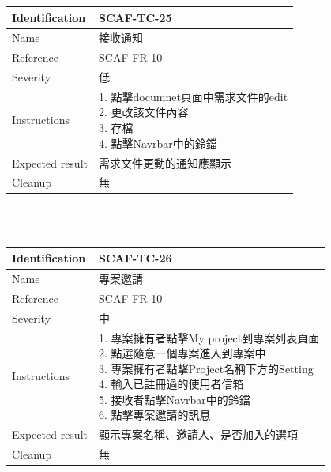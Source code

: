 \documentclass{report}
\begin{document}
\begin{tabularx}{\textwidth}{
  |p{}%
  |p{}|%
  }
  \hline
  \centering Identification &  SCAF-TC-25 \\
  \hline
  \centering Name & 接收通知 \\
  \hline
  \centering Reference & SCAF-FR-10 \\
  \hline
  \centering Severity & 低 \\
  \hline
  \centering Instructions & 
  \makecell[l]{
    1. 點擊documnet頁面中需求文件的edit \\
    2. 更改該文件內容  \\
    3. 存檔  \\
    4. 點擊Navrbar中的鈴鐺
  }\\
  \hline
  \centering Expected result & 需求文件更動的通知應顯示 \\
  \hline
  \centering Cleanup & 無 \\
  \hline
\end{tabularx}
\\
\newline
\\
\begin{tabularx}{\textwidth}{
  |p{}%
  |p{}|%
  }
  \hline
  \centering Identification &  SCAF-TC-26 \\
  \hline
  \centering Name & 專案邀請 \\
  \hline
  \centering Reference & SCAF-FR-10 \\
  \hline
  \centering Severity & 中 \\
  \hline
  \centering Instructions & 
  \makecell[l]{
    1. 專案擁有者點擊My project到專案列表頁面 \\
    2. 點選隨意一個專案進入到專案中 \\
    3. 專案擁有者點擊Project名稱下方的Setting \\
    4. 輸入已註冊過的使用者信箱 \\
    5. 接收者點擊Navrbar中的鈴鐺 \\
    6. 點擊專案邀請的訊息 
  }\\
  \hline
  \centering Expected result & 顯示專案名稱、邀請人、是否加入的選項 \\
  \hline
  \centering Cleanup & 無 \\
  \hline
\end{tabularx}
\end{document}
